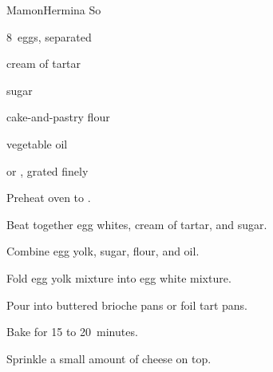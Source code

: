 \begin{recipe}{Mamon}{Hermina So}{}

\begin{ingredients}
\item 8~eggs, separated
\item \tp{\half} cream of tartar
\item \C{1\twothird} sugar
\item {} cake-and-pastry flour
\item \C{\half} vegetable oil
\item {} or , grated finely
\end{ingredients}

\begin{directions}
\item Preheat oven to .
\item Beat together egg whites, cream of tartar, and \C{\twothird} sugar.
\item Combine egg yolk,  sugar, flour, and oil.
\item Fold egg yolk mixture into egg white mixture.
\item Pour into buttered brioche pans or foil tart pans.
\item Bake for 15 to 20~minutes.
\item Sprinkle a small amount of cheese on top.
\end{directions}

\end{recipe}
